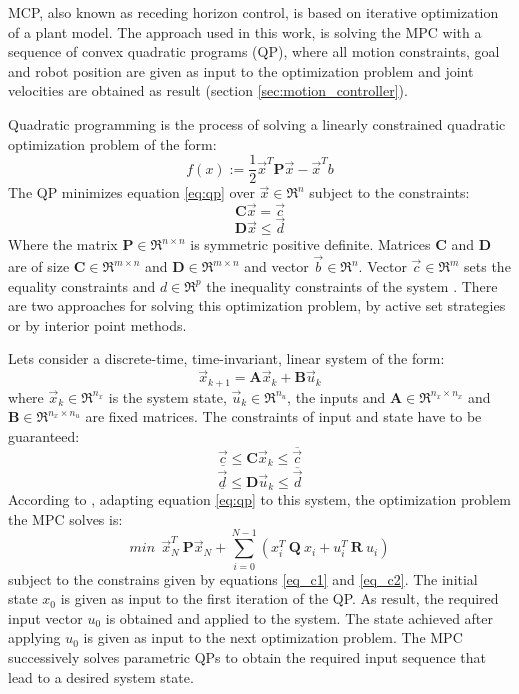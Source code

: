 MCP, also known as receding horizon control, is based on iterative optimization of a plant model. The approach used in this work, is solving the MPC with a sequence of convex quadratic programs (QP), where all motion constraints, goal and robot position are given as input to the optimization problem and joint velocities are obtained as result (section \ref{sec:motion_controller}).

Quadratic programming is the process of solving a linearly constrained quadratic optimization problem of the form:
\begin{equation}
f(x):= \frac{1}{2}\vec{x}^{T}\textbf{P}\vec{x} - \vec{x}^{T}b 
\label{eq:qp}
\end{equation}
The QP minimizes equation \ref{eq:qp} over $\vec{x} \in \Re ^{n}$ subject to the constraints:
$$\textbf{C}\vec{x} = \vec{c} $$
$$\textbf{D}\vec{x} \leq \vec{d}$$
Where the matrix $\textbf{P} \in \Re ^{n \times n}$ is symmetric positive definite. Matrices $\textbf{C}$ and $\textbf{D}$ are of size $\textbf{C} \in \Re ^{m \times n}$ and $\textbf{D} \in \Re ^{m \times n}$ and vector $\vec{b} \in \Re ^{n}$. Vector  $\vec{c} \in \Re ^{m}$ sets the equality constraints and $d \in \Re ^{p}$ the inequality constraints of the system \citep{qp_theory}. There are two approaches for solving this optimization problem, by active set strategies or by interior point methods.

Lets consider a discrete-time, time-invariant, linear system of the form:
\begin{equation}
\vec{x}_{k+1} =  \textbf{A}\vec{x}_{k} + \textbf{B}\vec{u}_{k}
\end{equation} 
where $\vec{x}_{k} \in \Re^{n_{x}}$ is the system state, $\vec{u}_{k} \in \Re ^{n_{u}}$, the inputs and $\textbf{A} \in \Re ^{n_{x} \times n_{x}}$  and $\textbf{B} \in \Re ^{n_{x} \times n_{u}}$ are fixed matrices. The constraints of input and state have to be guaranteed:
\begin{equation}
\underline{\vec{c}} \leq \textbf{C}\vec{x}_k \leq \overline{\vec{c}}
\label{eq_c1}
\end{equation} 
\begin{equation}
\underline{\vec{d}} \leq \textbf{D}\vec{u}_k \leq \overline{\vec{d}}
\label{eq_c2}
\end{equation} 
According to \citet{qp_algorithm}, adapting equation \ref{eq:qp} to this system, the optimization problem the MPC solves is:
\begin{equation}
min\ \ \vec{x}_{N}^{T}\ \textbf{P}\vec{x}_N + \sum_{i=0}^{N-1} (x_{i}^{T}\ \textbf{Q}\ x_i + u_{i}^{T}\ \textbf{R}\ u_i)
\end{equation} 
subject to the constrains given by equations \ref{eq_c1} and \ref{eq_c2}. The initial state $x_0$ is given as input to the first iteration of the QP. As result, the required input vector $u_0$ is obtained and applied to the system. The state achieved after applying $u_0$ is given as input to the next optimization problem. The MPC successively solves parametric QPs to obtain the required input sequence that lead to a desired system state.

